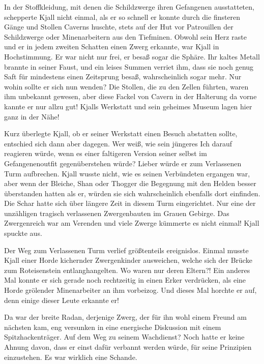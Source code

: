 In der Stoffkleidung, mit denen die Schildzwerge ihren Gefangenen ausstatteten, schepperte Kjall nicht einmal, als er so schnell er konnte durch die finsteren Gänge und Stollen Caverns huschte, stets auf der Hut vor Patrouillen der Schildzwerge oder Minenarbeitern aus den Tiefminen. Obwohl sein Herz raste und er in jedem zweiten Schatten einen Zwerg erkannte, war Kjall in Hochstimmung. Er war nicht nur frei, er besaß sogar die Sphäre. Ihr kaltes Metall brannte in seiner Faust, und ein leises Summen verriet ihm, dass sie noch genug Saft für mindestens einen Zeitsprung besaß, wahrscheinlich sogar mehr. Nur wohin sollte er sich nun wenden? Die Stollen, die zu den Zellen führten, waren ihm unbekannt gewesen, aber diese Fackel von Cavern in der Halterung da vorne kannte er nur allzu gut! Kjalls Werkstatt und sein geheimes Museum lagen hier ganz in der Nähe!

Kurz überlegte Kjall, ob er seiner Werkstatt einen Besuch abstatten sollte, entschied sich dann aber dagegen. Wer weiß, wie sein jüngeres Ich darauf reagieren würde, wenn es einer faltigeren Version seiner selbst im Gefangenenoutfit gegenüberstehen würde? Lieber würde er zum Verlassenen Turm aufbrechen. Kjall wusste nicht, wie es seinen Verbündeten ergangen war, aber wenn der Bleiche, Shan oder Thogger die Begegnung mit den Helden besser überstanden hatten als er, würden sie sich wahrscheinlich ebenfalls dort einfinden. Die Schar hatte sich über längere Zeit in diesem Turm eingerichtet. Nur eine der unzähligen tragisch verlassenen Zwergenbauten im Grauen Gebirge. Das Zwergenreich war am Verenden und viele Zwerge kümmerte es nicht einmal! Kjall spuckte aus.\bigskip



Der Weg zum Verlassenen Turm verlief größtenteils ereignislos. Einmal musste Kjall einer Horde kichernder Zwergenkinder ausweichen, welche sich der Brücke zum Roteisenstein entlanghangelten. Wo waren nur deren Eltern?! Ein anderes Mal konnte er sich gerade noch rechtzeitig in einen Erker verdrücken, als eine Horde grölender Minenarbeiter an ihm vorbeizog. Und dieses Mal horchte er auf, denn einige dieser Leute erkannte er!

Da war der breite Radan, derjenige Zwerg, der für ihn wohl einem Freund am nächsten kam, eng versunken in eine energische Diskussion mit einem Spitzhackenträger. Auf dem Weg zu seinem Wachdienst? Noch hatte er keine Ahnung davon, dass er einst dafür verbannt werden würde, für seine Prinzipien einzustehen. Es war wirklich eine Schande.

